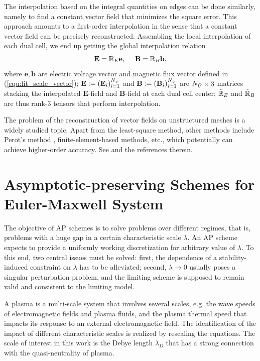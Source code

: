\documentclass{report}
\begin{document}
The interpolation based on the integral quantities on edges can be done similarly, namely to find a constant vector field that minimizes the square error. This approach amounts to a first-order interpolation in the sense that a constant vector field can be precisely reconstructed. Assembling the local interpolation of each dual cell, we end up getting the global interpolation relation
\begin{equation}
    \mathbf{E} = \Tilde{\mathbb{R}}_E\mathbf{e},
    \ \ \ \ 
    \mathbf{B} = \Tilde{\mathbb{R}}_B\mathbf{b},
\end{equation}
where $\mathbf{e}, \mathbf{b}$ are electric voltage vector and magnetic flux vector defined in (\ref{equ:fit_scale_vector}); $\mathbf{E} := (\mathbf{E}_i)_{i=1}^{N_{\Tilde{V}}}$ and $\mathbf{B} := (\mathbf{B}_i)_{i=1}^{N_{\Tilde{V}}}$ are $N_{\Tilde{V}} \times 3$ matrices stacking the interpolated $\mathbf{E}$-field and $\mathbf{B}$-field at each dual cell center; $\Tilde{\mathbb{R}}_E$ and $\Tilde{\mathbb{R}}_B$ are thus rank-3 tensors that perform interpolation.

The problem of the reconstruction of vector fields on unstructured meshes is a widely studied topic. Apart from the least-square method, other methods include Perot's method \citep{perot_2000}, finite-element-based methods, etc., which potentially can achieve higher-order accuracy. See \cite[][sec. 3.4.4]{fuchs_2021} and the references therein.  

\chapter{Asymptotic-preserving Schemes for Euler-Maxwell System}
The objective of AP schemes is to solve problems over different regimes, that is, problems with a huge gap in a certain characteristic scale $\lambda$. An AP scheme expects to provide a uniformly working discretization for arbitrary value of $\lambda$. To this end, two central issues must be solved: first, the dependence of a stability-induced constraint on $\lambda$ has to be alleviated; second, $\lambda \rightarrow 0$ usually poses a singular perturbation problem, and the limiting scheme is supposed to remain valid and consistent to the limiting model.

A plasma is a multi-scale system that involves several scales, e.g. the wave speeds of electromagnetic fields and plasma fluids, and the plasma thermal speed that impacts its response to an external electromagnetic field. The identification of the impact of different characteristic scales is realized by rescaling the equations. The scale of interest in this work is the Debye length $\lambda_D$ that has a strong connection with the quasi-neutrality of plasma.
\end{document}
